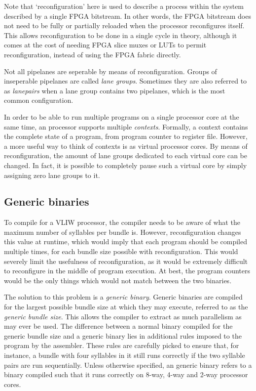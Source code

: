 Note that `reconfiguration' here is used to describe a process within the system 
described by a single FPGA bitstream. In other words, the FPGA bitstream does 
not need to be fully or partially reloaded when the \rvex{} processor 
reconfigures itself. This allows reconfiguration to be done in a single cycle in 
theory, although it comes at the cost of needing FPGA slice muxes or LUTs to 
permit reconfiguration, instead of using the FPGA fabric directly.

Not all pipelanes are seperable by means of reconfiguration. Groups of 
inseperable pipelanes are called \textit{lane groups}. Sometimes they are also 
referred to as \textit{lanepairs} when a lane group contains two pipelanes, 
which is the most common configuration.

In order to be able to run multiple programs on a single \rvex{} processor core 
at the same time, an \rvex{} processor supports multiple \textit{contexts}. 
Formally, a context contains the complete state of a program, from program 
counter to register file. However, a more useful way to think of \rvex{} 
contexts is as virtual processor cores. By means of reconfiguration, the amount 
of lane groups dedicated to each virtual core can be changed. In fact, it is 
possible to completely pause such a virtual core by simply assigning zero lane 
groups to it.

\subsection{Generic binaries}
\label{sec:core-ug-intro-gen-bin}

To compile for a VLIW processor, the compiler needs to be aware of what the 
maximum number of syllables per bundle is. However, reconfiguration changes this 
value at runtime, which would imply that each program should be compiled 
multiple times, for each bundle size possible with reconfiguration. This would 
severely limit the usefulness of reconfiguration, as it would be extremely 
difficult to reconfigure in the middle of program execution. At best, the 
program counters would be the only things which would not match between the two 
binaries.

The solution to this problem is a \textit{generic binary}. Generic binaries are compiled for the 
largest possible bundle size at which they may execute, referred to as the 
\textit{generic bundle size}. This allows the compiler to extract as much 
parallelism as may ever be used. The difference between a normal binary compiled 
for the generic bundle size and a generic binary lies in additional rules 
imposed to the program by the assembler. These rules are carefully picked to 
ensure that, for instance, a bundle with four syllables in it still runs 
correctly if the two syllable pairs are run sequentially. Unless otherwise 
specified, an \rvex{} generic binary refers to a binary compiled such that it 
runs correctly on 8-way, 4-way and 2-way \rvex{} processor cores.

